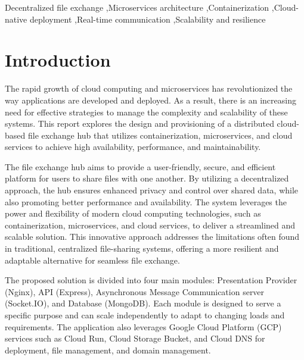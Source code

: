 \documentclass[a4paper,fleqn]{cas-dc}
\begin{document}
\begin{keywords}
Decentralized file exchange \sep Microservices architecture \sep Containerization \sep Cloud-native deployment \sep Real-time communication \sep Scalability and resilience
\end{keywords}


\maketitle

\section{Introduction}

The rapid growth of cloud computing and microservices has revolutionized the way applications are developed and deployed. As a result, there is an increasing need for effective strategies to manage the complexity and scalability of these systems. This report explores the design and provisioning of a distributed cloud-based file exchange hub that utilizes containerization, microservices, and cloud services to achieve high availability, performance, and maintainability.

The file exchange hub aims to provide a user-friendly, secure, and efficient platform for users to share files with one another. By utilizing a decentralized approach, the hub ensures enhanced privacy and control over shared data, while also promoting better performance and availability. The system leverages the power and flexibility of modern cloud computing technologies, such as containerization, microservices, and cloud services, to deliver a streamlined and scalable solution. This innovative approach addresses the limitations often found in traditional, centralized file-sharing systems, offering a more resilient and adaptable alternative for seamless file exchange.

The proposed solution is divided into four main modules: Presentation Provider (Nginx), API (Express), Asynchronous Message Communication server (Socket.IO), and Database (MongoDB). Each module is designed to serve a specific purpose and can scale independently to adapt to changing loads and requirements. The application also leverages Google Cloud Platform (GCP) services such as Cloud Run, Cloud Storage Bucket, and Cloud DNS for deployment, file management, and domain management.
\end{document}

